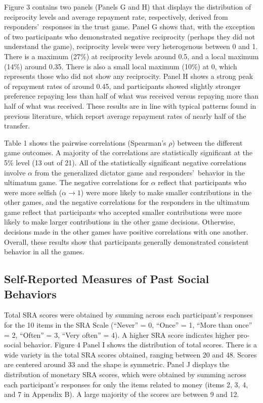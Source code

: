 \documentclass[12pt]{article}
\begin{document}
Figure 3 contains two panels (Panels G and H) that displays the distribution of reciprocity levels and average repayment rate, respectively, derived from responders\rq \ responses in the trust game. Panel G shows that, with the exception of two participants who demonstrated negative reciprocity (perhaps they did not understand the game), reciprocity levels were very heterogenous between 0 and 1. There is a maximum (27\%) at reciprocity levels around 0.5, and a local maximum (14\%) around 0.35. There is also a small local maximum (10\%) at 0, which represents those who did not show any reciprocity. Panel H shows a strong peak of repayment rates of around 0.45, and participants showed slightly stronger preference repaying less than half of what was received versus repaying more than half of what was received. These results are in line with typical patterns found in previous literature, which report average repayment rates of nearly half of the transfer.

Table 1 shows the pairwise correlations (Spearman\rq s \(\rho\)) between the different game outcomes. A majority of the correlations are statistically significant at the 5\% level (13 out of 21). All of the statistically significant negative correlations involve \(\alpha\) from the generalized dictator game and responders\rq \ behavior in the ultimatum game. The negative correlations for \(\alpha\) reflect that participants who were more selfish (\(\alpha \rightarrow 1\)) were more likely to make smaller contributions in the other games, and the negative correlations for the responders in the ultimatum game reflect that participants who accepted smaller contributions were more likely to make larger contributions in the other game decisions. Otherwise, decisions made in the other games have positive correlations with one another. Overall, these results show that participants generally demonstrated consistent behavior in all the games.

\subsection{Self-Reported Measures of Past Social Behaviors}

Total SRA scores were obtained by summing across each participant\rq s responses for the 10 items in the SRA Scale (``Never'' = 0, ``Once'' = 1, ``More than once'' = 2, ``Often'' = 3, ``Very often'' = 4). A higher SRA score indicates higher pro-social behavior. Figure 4 Panel I shows the distribution of total scores. There is a wide variety in the total SRA scores obtained, ranging between 20 and 48. Scores are centered around 33 and the shape is symmetric. Panel J displays the distribution of monetary SRA scores, which were obtained by summing across each participant\rq s responses for only the items related to money (items 2, 3, 4, and 7 in Appendix B).  A large majority of the scores are between 9 and 12.
\end{document}
